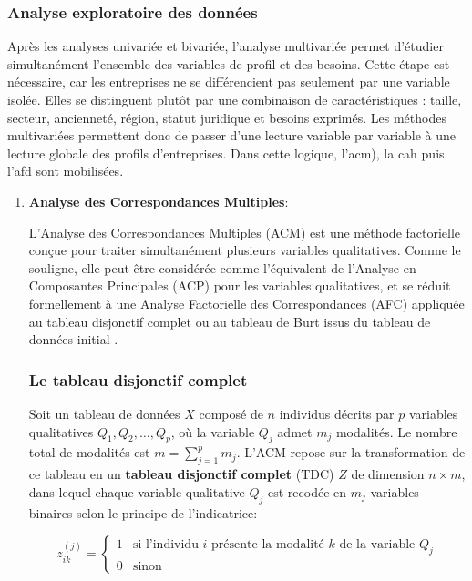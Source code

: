 \documentclass[12pt, a4paper, oneside]{report}
\begin{document}
	\subsubsection{Analyse exploratoire des données}
	Après les analyses univariée et bivariée, l’analyse multivariée permet d’étudier simultanément l’ensemble des variables de profil et des besoins. Cette étape est nécessaire, car les entreprises ne se différencient pas seulement par une variable isolée. Elles se distinguent plutôt par une combinaison de caractéristiques : taille, secteur, ancienneté, région, statut juridique et besoins exprimés. Les méthodes multivariées permettent donc de passer d’une lecture variable par variable à une lecture globale des profils d’entreprises. Dans cette logique, l’\gls{acm}), la \gls{cah} puis l'\gls{afd} sont mobilisées.
	\begin{enumerate}
		\item \textbf{Analyse des Correspondances Multiples}:
	
	L'Analyse des Correspondances Multiples (ACM) est une m\'ethode
	factorielle con\c{c}ue pour traiter simultan\'ement plusieurs
	variables qualitatives. Comme le souligne,
	elle peut \^etre consid\'er\'ee comme l'\'equivalent de
	l'Analyse en Composantes Principales (ACP) pour les variables
	qualitatives, et se r\'eduit formellement \`a une Analyse
	Factorielle des Correspondances (AFC) appliqu\'ee au tableau
	disjonctif complet ou au tableau de Burt issus du tableau de
	donn\'ees initial \cite{saporta_2010}.
	
	\subsubsection*{Le tableau disjonctif complet}
	
	Soit un tableau de donn\'ees $X$ compos\'e de $n$ individus
	d\'ecrits par $p$ variables qualitatives $Q_1, Q_2, \ldots,
	Q_p$, o\`u la variable $Q_j$ admet $m_j$ modalit\'es. Le
	nombre total de modalit\'es est $m = \sum_{j=1}^{p} m_j$.
	L'ACM repose sur la transformation de ce tableau en un
	\textbf{tableau disjonctif complet} (TDC) $Z$ de dimension
	$n \times m$, dans lequel chaque variable qualitative $Q_j$
	est recodée en $m_j$ variables binaires selon le principe
	de l'indicatrice:
	
	\begin{equation}
		z_{ik}^{(j)} =
		\begin{cases}
			1 & \text{si l'individu } i \text{ pr\'esente la modalit\'e }
			k \text{ de la variable } Q_j \\
			0 & \text{sinon}
		\end{cases}
		\label{eq:tdc}
	\end{equation}

\end{enumerate}
\end{document}
